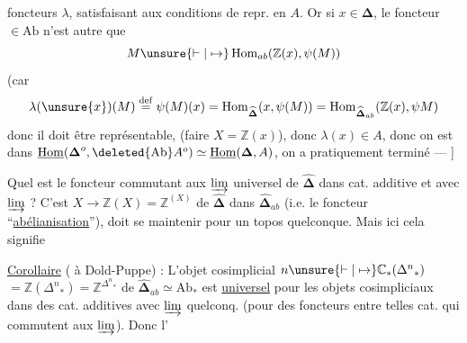 foncteurs $\lambda$, satisfaisant aux conditions de
repr.  en $A$. Or si $x\in\boldsymbol\Delta$, le foncteur 
$\in\mathrm{Ab}$ n'est autre que
\[
M\unsure{\vdash|\mapsto}\operatorname{Hom}_{ab}(\mathbb Z(x),\psi(M))
\]
(car
\[
\lambda(\unsure{x})(M)\overset{\mathrm{def}}=\psi(M)(x)
=\operatorname{Hom}_{\widehat{\boldsymbol\Delta}}(x,\psi(M))
=\operatorname{Hom}_{\widehat{\boldsymbol\Delta}_{ab}}(\mathbb Z(x),\psi M)
\]
donc il doit être représentable,  (faire $X
=\mathbb Z(x)$), donc $\lambda(x)\in A$, donc on est
dans $\underline{\operatorname{Hom}}(\boldsymbol\Delta^o,\deleted{\mathrm{Ab}}A^o)\simeq\underline{\operatorname{Hom}}(\boldsymbol\Delta,A)$,
on a pratiquement terminé --- ]

Quel est  le foncteur commutant aux
$\varinjlim$  universel de $\widehat{\boldsymbol\Delta}$ dans cat.
additive et avec $\varinjlim$ ? C'est
$X\longrightarrow\mathbb Z(X)=\mathbb Z^{(X)}$ de $\widehat{\boldsymbol\Delta}$ dans $\widehat{\boldsymbol\Delta}_{ab}$
(i.e. le foncteur ``\uline{abélianisation}''), 
doit se maintenir pour un topos quelconque.
Mais ici  cela signifie

\uline{Corollaire} ( à Dold-Puppe) :  L'objet
cosimplicial  $n\unsure{\vdash|\mapsto}\mathbb C_*({\Delta^n}_*)$
$=\mathbb Z({\Delta^n}_*)=\mathbb Z^{{\Delta^n}_*}$ de $\widehat{\boldsymbol\Delta}_{ab}\simeq\mathrm{Ab}_*$
est \uline{universel} pour les objets cosimpliciaux
dans des cat. additives avec
$\varinjlim$ quelconq. (pour des foncteurs entre
telles cat. qui commutent aux
$\varinjlim$). Donc l'
